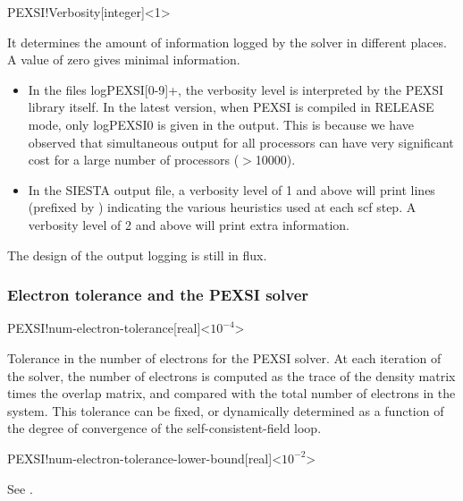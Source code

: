 \begin{fdfentry}{PEXSI!Verbosity}[integer]<1>

  It determines the amount of information logged by the solver in
  different places. A value of zero gives minimal information.
  \begin{itemize}

    \item%
    In the files logPEXSI[0-9]+, the verbosity level is interpreted by
    the PEXSI library itself. In the latest version, when PEXSI is
    compiled in RELEASE mode, only logPEXSI0 is given in the output.
    This is because we have observed that simultaneous output for all
    processors can have very significant cost for a large number of
    processors ($>$10000).  

    \item%
    In the SIESTA output file, a verbosity level of 1 and above will
    print lines (prefixed by ) indicating the various heuristics
    used at each scf step. A verbosity level of 2 and above will print
    extra information.

  \end{itemize}
  The design of the output logging is still in flux.
  
\end{fdfentry}

\subsubsection{Electron tolerance and the PEXSI solver}


\begin{fdfentry}{PEXSI!num-electron-tolerance}[real]<$10^{-4}$>

  Tolerance in the number of electrons for the PEXSI solver. At each
  iteration of the solver, the number of electrons is computed as the
  trace of the density matrix times the overlap matrix, and compared
  with the total number of electrons in the system. This tolerance can
  be fixed, or dynamically determined as a function of the degree of
  convergence of the self-consistent-field loop.
  
\end{fdfentry}

\begin{fdfentry}{PEXSI!num-electron-tolerance-lower-bound}[real]<$10^{-2}$>

  See .

\end{fdfentry}

